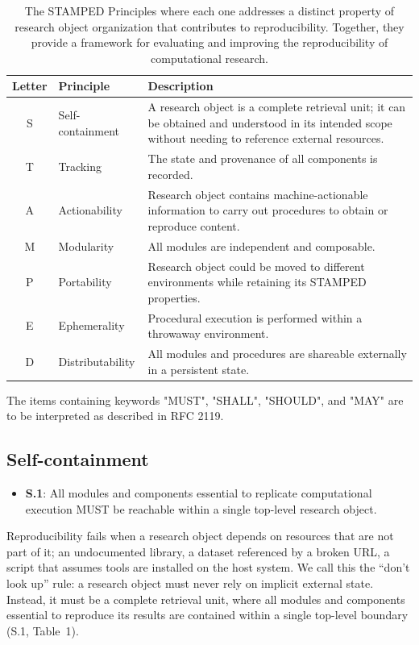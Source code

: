 \documentclass{article}
\makeatletter
\newcommand{\hyanchor}[1]{\texorpdfstring{\Hy@raisedlink{\hypertarget{#1}{}}}{}}
\newcommand{\anchoredsubsection}[2]{\subsection[#2]{\hyanchor{#1}#2}}
\makeatother
\begin{document}
\begin{table}[htbp]
\centering
\caption{The STAMPED Principles where each one addresses a distinct property of research object organization that contributes to reproducibility. Together, they provide a framework for evaluating and improving the reproducibility of computational research.}
\label{tab:stamped}
\begin{tabular}{c l p{}}
\hline
\textbf{Letter} & \textbf{Principle} & \textbf{Description} \\
\hline
S & Self-containment & A research object is a complete retrieval unit; it can be obtained and understood in its intended scope without needing to reference external resources. \\
T & Tracking & The state and provenance of all components is recorded. \\
A & Actionability & Research object contains machine-actionable information to carry out procedures to obtain or reproduce content. \\
M & Modularity & All modules are independent and composable. \\
P & Portability & Research object could be moved to different environments while retaining its STAMPED properties. \\
E & Ephemerality & Procedural execution is performed within a throwaway environment. \\
D & Distributability & All modules and procedures are shareable externally in a persistent state. \\
\hline
\end{tabular}
\end{table}

The items containing keywords "MUST", "SHALL", "SHOULD", and "MAY" are to be interpreted as described in RFC 2119\cite{bradner_key_1997}.



\anchoredsubsection{self-containment}{Self-containment}

\begin{itemize}
    \item \textbf{S.1}: All modules and components essential to replicate computational execution MUST be reachable within a single top-level research object.
\end{itemize}

Reproducibility fails when a research object depends on resources that are not part of it; an undocumented library, a dataset referenced by a broken URL, a script that assumes tools are installed on the host system.
We call this the ``don't look up'' rule: a research object must never rely on implicit external state.
Instead, it must be a complete retrieval unit, where all modules and components essential to reproduce its results are contained within a single top-level boundary (S.1, Table~1).
\end{document}
